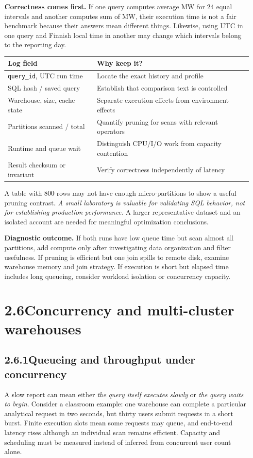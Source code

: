 \documentclass[11pt,twoside]{article}
\newcommand{\topic}[2]{\subsection*{#1\quad #2}}
\begin{document}
\begin{whitebox}
\textbf{Correctness comes first.} If one query computes average MW for 24 equal intervals and another computes sum of MW, their execution time is not a fair benchmark because their answers mean different things. Likewise, using UTC in one query and Finnish local time in another may change which intervals belong to the reporting day.
\end{whitebox}

\begin{center}\small
\begin{tabularx}{\linewidth}{@{}p{37mm}X@{}}\toprule
\textbf{Log field} & \textbf{Why keep it?}\\\midrule
\texttt{query\_id}, UTC run time & Locate the exact history and profile\\
SQL hash / saved query & Establish that comparison text is controlled\\
Warehouse, size, cache state & Separate execution effects from environment effects\\
Partitions scanned / total & Quantify pruning for scans with relevant operators\\
Runtime and queue wait & Distinguish CPU/I/O work from capacity contention\\
Result checksum or invariant & Verify correctness independently of latency\\
\bottomrule\end{tabularx}\end{center}

A table with 800 rows may not have enough micro-partitions to show a useful pruning contrast. \emph{A small laboratory is valuable for validating SQL behavior, not for establishing production performance.} A larger representative dataset and an isolated account are needed for meaningful optimization conclusions.

\textbf{Diagnostic outcome.} If both runs have low queue time but scan almost all partitions, add compute only after investigating data organization and filter usefulness. If pruning is efficient but one join spills to remote disk, examine warehouse memory and join strategy. If execution is short but elapsed time includes long queueing, consider workload isolation or concurrency capacity.


\newpage
\section*{2.6\quad Concurrency and multi-cluster warehouses}
\topic{2.6.1}{Queueing and throughput under concurrency}
A slow report can mean either \emph{the query itself executes slowly} or \emph{the query waits to begin}. Consider a classroom example: one warehouse can complete a particular analytical request in two seconds, but thirty users submit requests in a short burst. Finite execution slots mean some requests may queue, and end-to-end latency rises although an individual scan remains efficient. Capacity and scheduling must be measured instead of inferred from concurrent user count alone.
\end{document}

